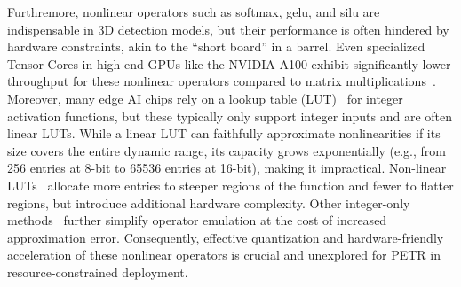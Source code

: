 Furthremore, nonlinear operators such as softmax, gelu, and silu are indispensable in 3D detection models, but their performance is often hindered by hardware constraints, akin to the ``short board'' in a barrel. Even specialized Tensor Cores in high-end GPUs like the NVIDIA A100 exhibit significantly lower throughput for these nonlinear operators compared to matrix multiplications~\cite{dao2023flashattention}. Moreover, many edge AI chips rely on a lookup table (LUT)~\cite{wang2018look} for integer activation functions, but these typically only support integer inputs and are often linear LUTs. While a linear LUT can faithfully approximate nonlinearities if its size covers the entire dynamic range, its capacity grows exponentially (e.g., from 256 entries at 8-bit to 65536 entries at 16-bit), making it impractical. Non-linear LUTs~\cite{yu2022nn} allocate more entries to steeper regions of the function and fewer to flatter regions, but introduce additional hardware complexity. Other integer-only methods~\cite{kim2021bert,li2023vit} further simplify operator emulation at the cost of increased approximation error. Consequently, effective quantization and hardware-friendly acceleration of these nonlinear operators is crucial and unexplored for PETR in resource-constrained deployment.


